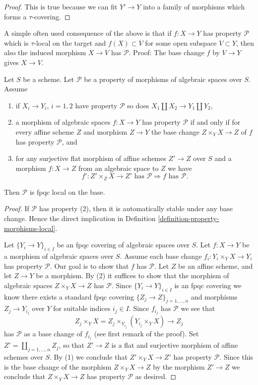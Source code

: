 \begin{proof}
This is true because we can fit $Y' \to Y$ into a family of
morphisms which forms a $\tau$-covering.
\end{proof}

\noindent
A simple often used consequence of the above is that if
$f : X \to Y$ has property $\mathcal{P}$ which is $\tau$-local
on the target and $f(X) \subset V$
for some open subspace $V \subset Y$, then also the induced
morphism $X \to V$ has $\mathcal{P}$. Proof: The base change
$f$ by $V \to Y$ gives $X \to V$.

\begin{lemma}
\label{lemma-descending-properties-morphisms}
Let $S$ be a scheme. Let $\mathcal{P}$ be a property of morphisms of
algebraic spaces over $S$. Assume
\begin{enumerate}
\item if $X_i \to Y_i$, $i = 1, 2$ have property $\mathcal{P}$ so
does $X_1 \amalg X_2 \to Y_1 \amalg Y_2$,
\item a morphism of algebraic spaces $f : X \to Y$ has property
$\mathcal{P}$ if and only if for every affine scheme $Z$ and
morphism $Z \to Y$ the base change $Z \times_Y X \to Z$ of $f$
has property $\mathcal{P}$, and
\item for any surjective flat morphism of affine schemes
$Z' \to Z$ over $S$ and a morphism $f : X \to Z$ from an algebraic space
to $Z$ we have
$$
f' : Z' \times_Z X \to Z'\text{ has }\mathcal{P}
\Rightarrow
f\text{ has }\mathcal{P}.
$$
\end{enumerate}
Then $\mathcal{P}$ is fpqc local on the base.
\end{lemma}

\begin{proof}
If $\mathcal{P}$ has property (2), then it is automatically
stable under any base change. Hence the direct implication in
Definition \ref{definition-property-morphisms-local}.

\medskip\noindent
Let $\{Y_i \to Y\}_{i \in I}$ be an fpqc covering of algebraic spaces over $S$.
Let $f : X \to Y$ be a morphism of algebraic spaces over $S$.
Assume each base change $f_i : Y_i \times_Y X \to Y_i$ has property
$\mathcal{P}$. Our goal is to show that $f$ has $\mathcal{P}$.
Let $Z$ be an affine scheme, and let $Z \to Y$ be a morphism.
By (2) it suffices to show that the morphism of algebraic spaces
$Z \times_Y X \to Z$ has $\mathcal{P}$.
Since $\{Y_i \to Y\}_{i \in I}$ is an fpqc covering we know there
exists a standard fpqc covering $\{Z_j \to Z\}_{j = 1, \ldots , n}$
and morphisms $Z_j \to Y_{i_j}$ over $Y$ for suitable indices $i_j \in I$.
Since $f_{i_j}$ has $\mathcal{P}$ we see that
$$
Z_j \times_Y X
=
Z_j \times_{Y_{i_j}} (Y_{i_j} \times_Y X)
\longrightarrow
Z_j
$$
has $\mathcal{P}$ as a base change of $f_{i_j}$ (see first remark of the
proof). Set $Z' = \coprod_{j = 1, \ldots, n} Z_j$, so that $Z' \to Z$ is
a flat and surjective morphism of affine schemes over $S$. By (1)
we conclude that $Z' \times_Y X \to Z'$ has property $\mathcal{P}$.
Since this is the base change of the morphism $Z \times_Y X \to Z$
by the morphism $Z' \to Z$ we conclude that
$Z \times_Y X \to Z$ has property $\mathcal{P}$ as desired.
\end{proof}


